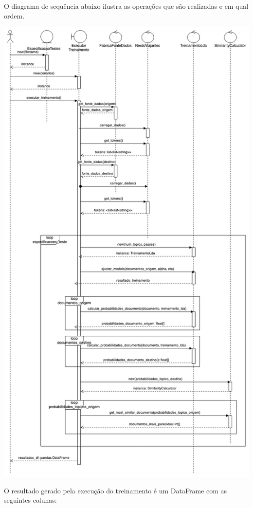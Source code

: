 O diagrama de sequência abaixo ilustra as operações que são realizadas e em qual ordem.

\includegraphics[scale=0.4]{diagramas/lda_treinamento_sequence_diagram.png}

O resultado gerado pela execução do treinamento é um DataFrame com as seguintes colunas:

